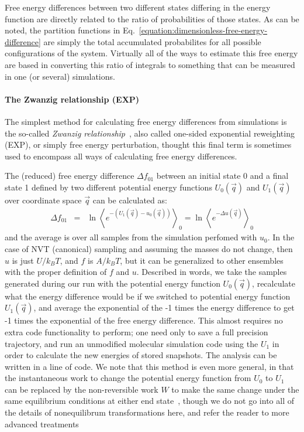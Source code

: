 \documentclass[9pt,bestpractices]{livecoms}
\newcommand{\expect}[1]{\left\langle{#1}\right\rangle}
\begin{document}
Free energy differences between two different states differing in the energy function are directly related to the
ratio of probabilities of those states.
As can be noted, the partition functions in Eq.~\ref{equation:dimensionless-free-energy-difference} are simply the total accumulated probabilites for all possible configurations of the system. Virtually all of the ways to estimate this free energy are based in converting this ratio of integrals to something that can be measured in one (or several) simulations.  

\paragraph{The Zwanzig relationship (EXP)}

The simplest method for calculating free energy
differences from simulations is the so-called \textit{Zwanzig
relationship}~\cite{zwanzig1954hightemperature}, also called one-sided exponential reweighting (EXP), or simply free energy perturbation, thought this final term is sometimes used to encompass all ways of calculating free energy differences.

The (reduced) free energy difference $\Delta f_{01}$ between an initial state 0 and a final state 1 defined by two different potential energy functions 
$U_0(\vec{q})$ and $U_1(\vec{q})$ over coordinate space $\vec{q}$ can be calculated as:
\begin{eqnarray}
\Delta f_{01} & = & \ln \expect{e^{-(U_1(\vec{q}) - u_0(\vec{q}))}}_0 =  \ln \expect{e^{-\Delta u(\vec{q})} }_0
\end{eqnarray}\label{eqn.zwanzig}
and the average is over all samples from the simulation perfomed with $u_0$. In the case of NVT (canonical) sampling and assuming the masses do not change, then $u$ is just $U/k_BT$, and $f$ is $A/k_BT$, but it can be generalized to other ensembles with the proper definition of $f$ and $u$.
Described in words, we take the samples generated during our run with the potential energy function $U_0(\vec{q})$, recalculate what the energy difference would be if we switched to potential energy function $U_1(\vec{q})$, and average the exponential of the -1 times the energy difference to get -1 times the exponential of the free energy difference.   This almost requires no extra code functionality to perform; one need only to save a full precision trajectory, and run an unmodified molecular simulation code using the $U_1$ in order to calculate the new energies of stored snapshots.  The analysis can be written in a line of code.  We note that this method is even more general, in that the instantaneous work to change the potential energy function from $U_0$ to $U_1$ can be replaced by the non-reversible work $W$ to make the same change under the same equilibrium conditions at either end state~\cite{Jarzynski:PRL:1997,Jarzynski:APPB:1998,Crooks:PRE:2000}, though we do not go into all of the details of nonequilibrum transformations here, and refer the reader to more advanced treatments~\cite{Maragakis:JCP:2008,Oberhofer:JPCB:2005,Procacci:JCP:2015,Shirts:PRL:2003,Ytreberg:JCP:2004}
\end{document}
